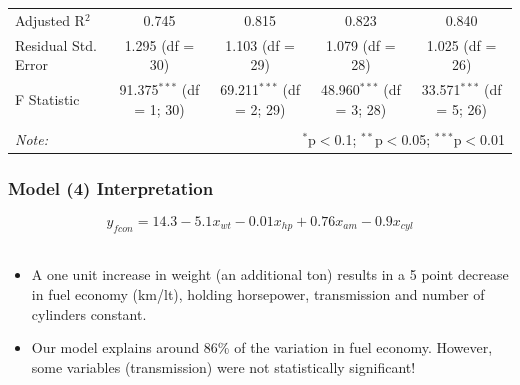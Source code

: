 \documentclass[aspectratio=169]{beamer}
\begin{document}
\begin{frame}
\begin{table}[!htbp]
\begin{tabular}{@{\extracolsep{5pt}}lcccc}
Adjusted R$^{2}$ & 0.745 & 0.815 & 0.823 & 0.840 \\ 
Residual Std. Error & 1.295 (df = 30) & 1.103 (df = 29) & 1.079 (df = 28) & 1.025 (df = 26) \\ 
F Statistic & 91.375$^{***}$ (df = 1; 30) & 69.211$^{***}$ (df = 2; 29) & 48.960$^{***}$ (df = 3; 28) & 33.571$^{***}$ (df = 5; 26) \\ 
\hline 
\hline \\[-1.8ex] 
\textit{Note:}  & \multicolumn{4}{r}{$^{*}$p$<$0.1; $^{**}$p$<$0.05; $^{***}$p$<$0.01} \\ 
\end{tabular} 
\end{table} 

\end{frame}


\begin{frame}
\frametitle{Model (4) Interpretation}
\Large
\begin{equation}
y_{fcon} = 14.3 - 5.1x_{wt} - 0.01x_{hp} + 0.76x_{am} - 0.9x_{cyl} \end{equation} \\
\vspace{.5cm}
\normalsize

\begin{itemize}
  
  \item A one unit increase in weight (an additional ton) results in a 5 point decrease in fuel economy (km/lt), holding horsepower, transmission and number of cylinders constant. 

  \item Our model explains around 86\% of the variation in fuel economy. However, some variables (transmission) were not statistically significant!
\end{itemize}

\end{frame}

\end{document}
